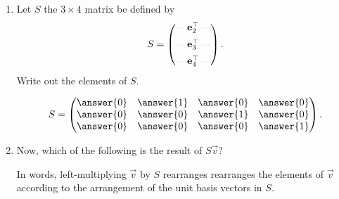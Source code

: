 \documentclass{ximera}
\newcommand{\rvx}[1]{\rule[0.5ex]{1em}{.05pt}\,#1\,\rule[0.5ex]{1em}{.05pt}}
\begin{document}
\begin{exercise}
\begin{enumerate}

  \item Let $S$ the $3 \times 4$ matrix be defined by
    \[
      S =
      \begin{pmatrix}
        \rvx{\vec{e}_2^\transpose}\\[0.5em]
        \rvx{\vec{e}_3^\transpose}\\[0.5em]
        \rvx{\vec{e}_4^\transpose}
      \end{pmatrix}.
    \]
    Write out the elements of $S$.
    \begin{prompt}
      \[
        S =
        \begin{pmatrix}
          \answer{0} & \answer{1} & \answer{0} & \answer{0} \\
          \answer{0} & \answer{0} & \answer{1} & \answer{0} \\
          \answer{0} & \answer{0} & \answer{0} & \answer{1}
        \end{pmatrix}.
      \]
    \end{prompt}

  \item  Now, which of the following is the result of $S \vec{v}$?
    \begin{multipleChoice}
      \pdfOnly{\end{multicols}}
    \end{multipleChoice}

    \begin{feedback}[correct]
      In words, left-multiplying $\vec{v}$ by $S$ rearranges
      rearranges the elements of $\vec{v}$ according to the
      arrangement of the unit basis vectors in $S$.
    \end{feedback}
  \end{enumerate}
\end{exercise}
\end{document}
